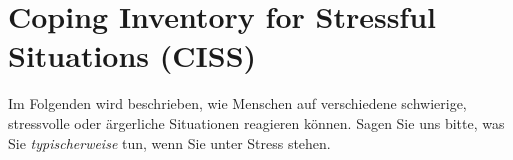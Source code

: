 \setcounter{section}{6}    
\section{Coping Inventory for Stressful Situations (CISS)} 

\begin{choicequestion}[cols=3]{}
      \end{choicequestion} 
 
  
    \begin{choicequestion}[cols=4]{}
\end{choicequestion}

Im Folgenden wird beschrieben, wie Menschen auf verschiedene schwierige, stressvolle oder ärgerliche Situationen reagieren können. Sagen Sie uns bitte, was Sie \emph{typischerweise} tun, wenn Sie unter Stress stehen.

